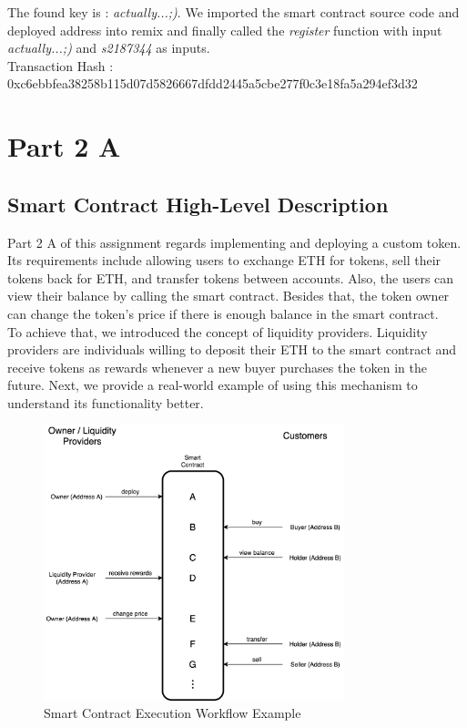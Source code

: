 \documentclass[12pt,a4paper]{article}
\begin{document}
\vspace{5mm}

The found key is : \emph{actually...;)}. We imported the smart contract source
code and deployed address into remix and finally called the \emph{register}
function with input \emph{actually...;)} and \emph{s2187344} as inputs. \\

Transaction Hash : 0xc6ebbfea38258b115d07d5826667dfdd2445a5cbe277f0c3e18fa5a294ef3d32

\section*{Part 2 A}

\subsection*{Smart Contract High-Level Description}

Part 2 A of this assignment regards implementing and deploying a custom token.
Its requirements include allowing users to exchange ETH for tokens, sell their
tokens back for ETH, and transfer tokens between accounts. Also, the users can
view their balance by calling the smart contract. Besides that, the token owner
can change the token's price if there is enough balance in the smart contract. \\

To achieve that, we introduced the concept of liquidity providers. Liquidity
providers are individuals willing to deposit their ETH to the smart contract and
receive tokens as rewards whenever a new buyer purchases the token in the
future. Next, we provide a real-world example of using this mechanism to
understand its functionality better. \\

\begin{figure}[htpb]
    \begin{center}
        \includegraphics[height=8cm]{execution_flow.png}
        \caption{Smart Contract Execution Workflow Example}
        \label{fig:smart-contract-example}
    \end{center}
\end{figure} 
\end{document}
